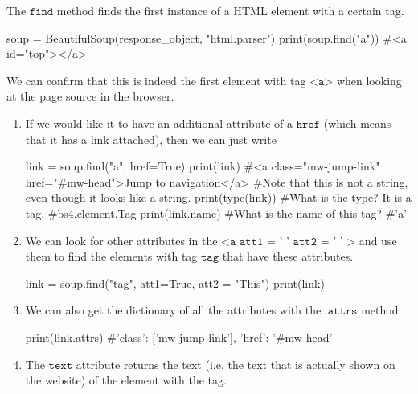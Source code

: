 \documentclass{article}
\begin{document}
  \begin{definition}
  The $\texttt{find}$ method finds the first instance of a HTML element with a certain tag. 
  \begin{python}
      soup = BeautifulSoup(response_object, "html.parser") 
      print(soup.find("a"))
      #<a id="top"></a>
  \end{python}
  We can confirm that this is indeed the first element with tag $\texttt{<a>}$ when looking at the page source in the browser. 
  \begin{enumerate}
      \item If we would like it to have an additional attribute of a $\texttt{href}$ (which means that it has a link attached), then we can just write
      \begin{python}
      link = soup.find("a", href=True)
      print(link)
      #<a class="mw-jump-link" href="#mw-head">Jump to navigation</a>
      #Note that this is not a string, even though it looks like a string. 
      print(type(link))     #What is the type? It is a tag.
      #bs4.element.Tag 
      print(link.name)      #What is the name of this tag? 
      #'a'
      \end{python}
      
      \item We can look for other attributes in the $\texttt{<a att1 = ' ' att2 = ' ' >}$ and use them to find the elements with tag $\texttt{tag}$ that have these attributes. 
      \begin{python}
      link = soup.find("tag", att1=True, att2 = "This")
      print(link) 
      \end{python}
      
      \item We can also get the dictionary of all the attributes with the $\texttt{.attrs}$ method. 
      \begin{python}
      print(link.attrs) 
      #{'class': ['mw-jump-link'], 'href': '#mw-head'}
      \end{python}
      
      \item The $\texttt{text}$ attribute returns the text (i.e. the text that is actually shown on the website) of the element with the tag. 
  \end{enumerate}
  \end{definition}
\end{document}
